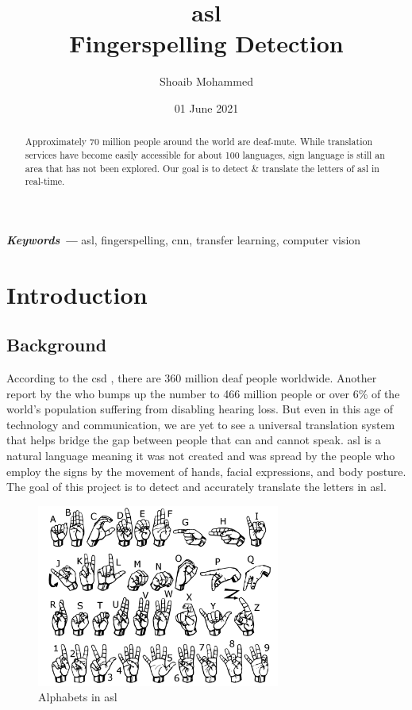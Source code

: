 \documentclass[twocolumn]{article}
\title{\gls{asl}\\
	Fingerspelling Detection}
\author{Shoaib Mohammed}
\date{01 June 2021}
\providecommand{\keywords}[1]
{
  \small
  \noindent \textbf{\textit{Keywords ---}} #1
}
\begin{document}
\begin{titlingpage}
\maketitle
\end{titlingpage}

\begin{abstract}
Approximately 70 million people around the world are deaf-mute. While 
translation services have become easily accessible for about 100 
languages, sign language is still an area that has not been explored. 
Our goal is to detect \& translate the letters of \gls{asl} in real-time.
\end{abstract}

\keywords{\gls{asl}, fingerspelling, \gls{cnn}, transfer learning, 
computer vision}


\section{Introduction}

\subsection{Background}
According to the \gls{csd} \cite{csd}, there are 360 million deaf people 
worldwide. Another report by the \gls{who} \cite{who} bumps up the number to 
466 million people or over 6\% of the world's population suffering from 
disabling hearing loss. But even in this age of technology and communication, 
we are yet to see a universal translation system that helps bridge the gap 
between people that can and cannot speak. \gls{asl} is a natural language 
meaning it was not created and was spread by the people who employ the signs 
by the movement of hands, facial expressions, and body posture. The goal of 
this project is to detect and accurately translate the letters in \gls{asl}.

\begin{figure}[h]
\centering
\includegraphics[width=8cm]{./figures/asl alphabets}
\caption{Alphabets in \gls{asl}}
\label{asl alphabets}
\end{figure}
\end{document}
